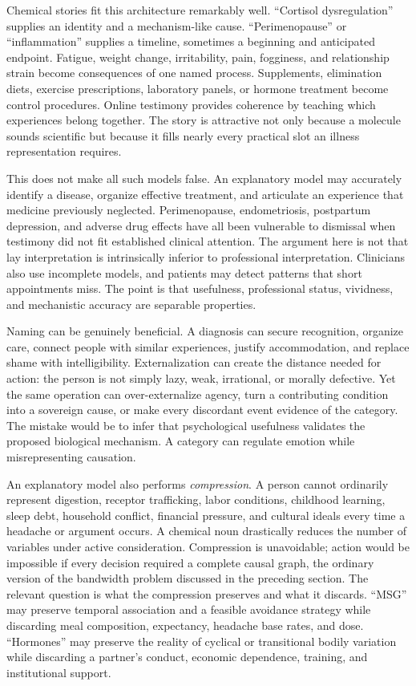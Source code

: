 \documentclass[11pt]{article}
\begin{document}
Chemical stories fit this architecture remarkably well. ``Cortisol dysregulation'' supplies an identity and a mechanism-like cause. ``Perimenopause'' or ``inflammation'' supplies a timeline, sometimes a beginning and anticipated endpoint. Fatigue, weight change, irritability, pain, fogginess, and relationship strain become consequences of one named process. Supplements, elimination diets, exercise prescriptions, laboratory panels, or hormone treatment become control procedures. Online testimony provides coherence by teaching which experiences belong together. The story is attractive not only because a molecule sounds scientific but because it fills nearly every practical slot an illness representation requires.

This does not make all such models false. An explanatory model may accurately identify a disease, organize effective treatment, and articulate an experience that medicine previously neglected. Perimenopause, endometriosis, postpartum depression, and adverse drug effects have all been vulnerable to dismissal when testimony did not fit established clinical attention. The argument here is not that lay interpretation is intrinsically inferior to professional interpretation. Clinicians also use incomplete models, and patients may detect patterns that short appointments miss. The point is that usefulness, professional status, vividness, and mechanistic accuracy are separable properties.

Naming can be genuinely beneficial. A diagnosis can secure recognition, organize care, connect people with similar experiences, justify accommodation, and replace shame with intelligibility. Externalization can create the distance needed for action: the person is not simply lazy, weak, irrational, or morally defective. Yet the same operation can over-externalize agency, turn a contributing condition into a sovereign cause, or make every discordant event evidence of the category. The mistake would be to infer that psychological usefulness validates the proposed biological mechanism. A category can regulate emotion while misrepresenting causation.

An explanatory model also performs \emph{compression}. A person cannot ordinarily represent digestion, receptor trafficking, labor conditions, childhood learning, sleep debt, household conflict, financial pressure, and cultural ideals every time a headache or argument occurs. A chemical noun drastically reduces the number of variables under active consideration. Compression is unavoidable; action would be impossible if every decision required a complete causal graph, the ordinary version of the bandwidth problem discussed in the preceding section. The relevant question is what the compression preserves and what it discards. ``MSG'' may preserve temporal association and a feasible avoidance strategy while discarding meal composition, expectancy, headache base rates, and dose. ``Hormones'' may preserve the reality of cyclical or transitional bodily variation while discarding a partner's conduct, economic dependence, training, and institutional support.
\end{document}
